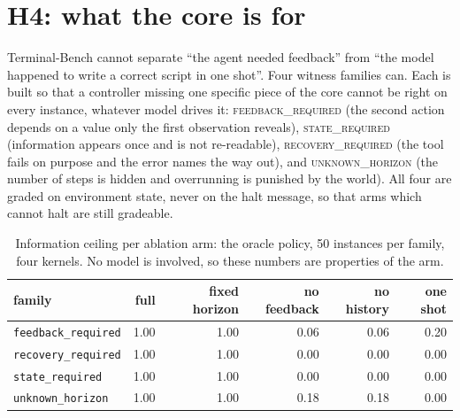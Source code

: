 \documentclass[11pt,a4paper]{article}
\begin{document}
\section{H4: what the core is for}
\label{sec:h4}

Terminal-Bench cannot separate ``the agent needed feedback'' from ``the model
happened to write a correct script in one shot''. Four witness families can.
Each is built so that a controller missing one specific piece of the core
cannot be right on every instance, whatever model drives it:
\textsc{feedback\_required} (the second action depends on a value only the
first observation reveals), \textsc{state\_required} (information appears once
and is not re-readable), \textsc{recovery\_required} (the tool fails on purpose
and the error names the way out), and \textsc{unknown\_horizon} (the number of
steps is hidden and overrunning is punished by the world). All four are graded
on environment state, never on the halt message, so that arms which cannot halt
are still gradeable.

\begin{table}[h]\centering\small
\caption{Information ceiling per ablation arm: the oracle policy, 50 instances
per family, four kernels. No model is involved, so these numbers are properties
of the arm.}
\label{tab:oracle}
\begin{tabular}{lrrrrr}
\toprule
family & full & fixed horizon & no feedback & no history & one shot \\
\midrule
\texttt{feedback\_required} & 1.00 & 1.00 & 0.06 & 0.06 & 0.20 \\
\texttt{recovery\_required} & 1.00 & 1.00 & 0.00 & 0.00 & 0.00 \\
\texttt{state\_required} & 1.00 & 1.00 & 0.00 & 0.00 & 0.00 \\
\texttt{unknown\_horizon} & 1.00 & 1.00 & 0.18 & 0.18 & 0.00 \\
\bottomrule
\end{tabular}
\end{table}
\end{document}
